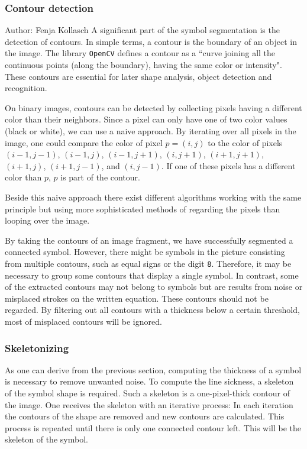 \documentclass[11pt]{article}
\begin{document}
	\subsubsection{Contour detection}
	\small{Author: Fenja Kollasch} \newline \newline
	A significant part of the symbol segmentation is the detection of contours. In simple terms, a contour is the boundary of an object in the image. The library \texttt{OpenCV} defines a contour as a ``curve joining all the continuous points (along the boundary), having the same color or intensity".
	These contours are essential for later shape analysis, object detection and recognition. 
	
	On binary images, contours can be detected by collecting pixels having a different color than their neighbors. Since a pixel can only have one of two color values (black or white), we can use a naive approach. By iterating over all pixels in the image, one could compare the color of pixel $p =(i, j)$ to the color of pixels $(i-1, j-1)$, $(i-1, j)$, $(i-1, j+1)$, $(i, j+1)$, $(i+1, j+1)$, $(i+1, j)$, $(i+1, j-1)$, and $(i, j-1)$. If one of these pixels has a different color than $p$, $p$ is part of the contour. 
	
	Beside this naive approach there exist different algorithms working with the same principle but using more sophisticated methods of regarding the pixels than looping over the image.
	
	By taking the contours of an image fragment, we have successfully segmented a connected symbol. However, there might be symbols in the picture consisting from multiple contours, such as equal signs or the digit \texttt{8}. Therefore, it may be necessary to group some contours that display a single symbol. In contrast, some of the extracted contours may not belong to symbols but are results from noise or misplaced strokes on the written equation. These contours should not be regarded. By filtering out all contours with a thickness below a certain threshold, most of misplaced contours will be ignored.
	
	\subsubsection{Skeletonizing}
	As one can derive from the previous section, computing the thickness of a symbol is necessary to remove unwanted noise. To compute the line sickness, a skeleton of the symbol shape is required. Such a skeleton is a one-pixel-thick contour of the image. One receives the skeleton with an iterative process: In each iteration the contours of the shape are removed and new contours are calculated. This process is repeated until there is only one connected contour left. This will be the skeleton of the symbol.
	
\end{document}
